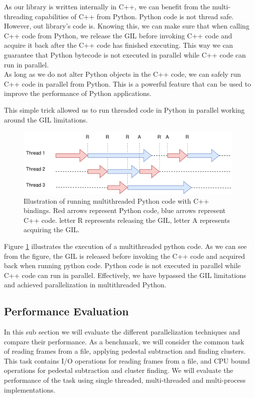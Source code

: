 \begin{spacing}{1.2}
    As our library is written internally in C++, we can benefit from the multi-threading capabilities
    of C++ from Python. Python code is not thread safe. However, out library's code is.
    Knowing this, we can make sure that when calling C++ code from Python, we release the GIL before
    invoking C++ code and acquire it back after the C++ code has finished executing. This way we can
    guarantee that Python bytecode is not executed in parallel while C++ code can run in parallel.\\

    As long as we do not alter Python objects in the C++ code, we can safely run C++ code in parallel
    from Python. This is a powerful feature that can be used to improve the performance of Python applications.

    This simple trick allowed us to run threaded code in Python in parallel working around the
    GIL limitations.

    \begin{figure}
        \centering
        \includegraphics[width=\textwidth]{Chapitre4/figures/gil_c.png}
        \caption{Illustration of running multithreaded Python code with C++ bindings. Red arrows
            represent Python code, blue arrows represent C++ code. letter R represents releasing the GIL,
            letter A represents acquiring the GIL.}
        \label{fig:python_parallelization}
    \end{figure}

    Figure \ref{fig:python_parallelization} illustrates the execution of a multithreaded python code.
    As we can see from the figure, the GIL is released before invoking the C++ code and acquired back
    when running python code. Python code is not executed in parallel while C++ code can run in parallel.
    Effectively, we have bypassed the GIL limitations and achieved parallelization in multithreaded Python.

    \subsection{Performance Evaluation}
    In this sub section we will evaluate the different parallelization techniques and compare their performance.
    As a benchmark, we will consider the common task of reading frames from a file, applying pedestal
    subtraction and finding clusters. This task contains I/O operations for reading frames from a file,
    and CPU bound operations for pedestal subtraction and cluster finding. We will evaluate the performance
    of the task using single threaded, multi-threaded and multi-process implementations.\\


\end{spacing}

